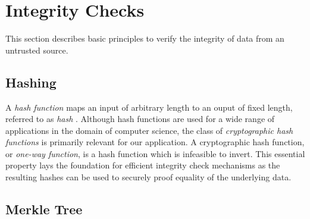 \section{Integrity Checks}

	This section describes basic principles to verify the integrity of data from an untrusted source.

	\subsection{Hashing}
	\label{subsec:hashing}

		A \emph{hash function} maps an input of arbitrary length to an ouput of fixed length, referred to as \emph{hash} \cite{menezes1996}.
		Although hash functions are used for a wide range of applications in the domain of computer science, the class of \emph{cryptographic hash functions} is primarily relevant for our application.
		A cryptographic hash function, or \emph{one-way function}, is a hash function which is infeasible to invert.
		This essential property lays the foundation for efficient integrity check mechanisms as the resulting hashes can be used to securely proof equality of the underlying data.

	\subsection{Merkle Tree}
	\label{subsec:merkle-tree}

